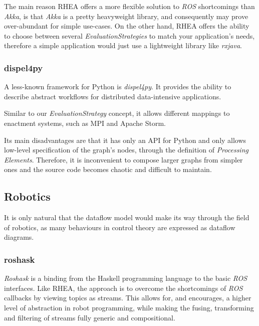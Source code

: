 \documentclass[sigplan,review,anonymous]{acmart}
\begin{document}

The main reason \textsc{RHEA} offers a more flexible solution to \textit{ROS}
shortcomings than \textit{Akka}, is that \textit{Akka} is a pretty heavyweight
library, and consequently may prove over-abundant for simple use-cases. On the
other hand, \textsc{RHEA} offers the ability to choose between several
\textit{EvaluationStrategies} to match your application's needs, therefore a
simple application would just use a lightweight library like \textit{rxjava}.

\subsubsection{dispel4py}

A less-known framework for Python is
\textit{dispel4py}. It provides the ability
to describe abstract workflows for distributed data-intensive applications.

Similar to our \textit{EvaluationStrategy} concept, it allows different mappings
to enactment systems, such as MPI and Apache
Storm.

Its main disadvantages are that it has only an API for Python and only allows
low-level specification of the graph's nodes, through the definition of
\textit{Processing Elements}. Therefore, it is inconvenient to compose larger
graphs from simpler ones and the source code becomes chaotic and difficult to
maintain.

\subsection{Robotics}

It is only natural that the dataflow model would make its way through the field
of robotics, as many behaviours in control theory are expressed as dataflow
diagrams.

\subsubsection{roshask}

\textit{Roshask}\cite{roshask} is a binding from the Haskell programming language
to the basic \textit{ROS} interfaces. Like \textsc{RHEA}, the approach is to
overcome the shortcomings of \textit{ROS} callbacks by viewing topics as
streams. This allows for, and encourages, a higher level of abstraction in
robot programming, while making the fusing, transforming and filtering of
streams fully generic and compositional.
\end{document}
